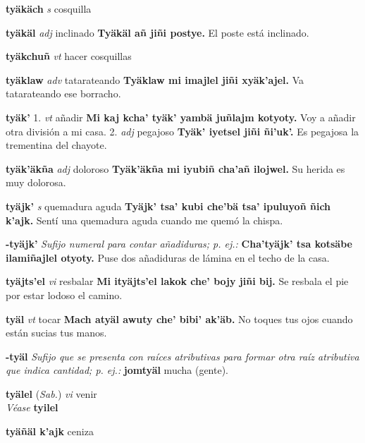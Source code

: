 \documentclass[10pt]{scrbook}
\newcommand{\entry}[1]{\textbf{#1}}
\newcommand{\onedefinition}[1]{#1.}
\newcommand{\nontranslationdef}[1]{\textit{#1}}
\newcommand{\partofspeech}[1]{\textit{#1}}
\newcommand{\spanishtranslation}[1]{#1}
\newcommand{\cholexample}[1]{\textbf{#1}}
\newcommand{\exampletranslation}[1]{#1}
\newcommand{\alsosee}[1]{\\\textit{Véase} \textbf{#1}}
\newcommand{\relevantdialect}[1]{(\textit{#1})}
\begin{document}
\begin{multicols}{2}
\entry{tyäkäch}
\partofspeech{s}
\spanishtranslation{cosquilla}

\entry{tyäkäl}
\partofspeech{adj}
\spanishtranslation{inclinado}
\cholexample{Tyäkäl añ jiñi postye.}
\exampletranslation{El poste está inclinado.}

\entry{tyäkchuñ}
\partofspeech{vt}
\spanishtranslation{hacer cosquillas}

\entry{tyäklaw}
\partofspeech{adv}
\spanishtranslation{tatarateando}
\cholexample{Tyäklaw mi imajlel jiñi xyäk'ajel.}
\exampletranslation{Va tatarateando ese borracho.}

\entry{tyäk'}
\onedefinition{1}
\partofspeech{vt}
\spanishtranslation{añadir}
\cholexample{Mi kaj kcha' tyäk' yambä juñlajm kotyoty.}
\exampletranslation{Voy a añadir otra división a mi casa.}
\onedefinition{2}
\partofspeech{adj}
\spanishtranslation{pegajoso}
\cholexample{Tyäk' iyetsel jiñi ñi'uk'.}
\exampletranslation{Es pegajosa la trementina del chayote.}

\entry{tyäk'äkña}
\partofspeech{adj}
\spanishtranslation{doloroso}
\cholexample{Tyäk'äkña mi iyubiñ cha'añ ilojwel.}
\exampletranslation{Su herida es muy dolorosa.}

\entry{tyäjk'}
\partofspeech{s}
\spanishtranslation{quemadura aguda}
\cholexample{Tyäjk' tsa' kubi che'bä tsa' ipuluyoñ ñich k'ajk.}
\exampletranslation{Sentí una quemadura aguda cuando me quemó la chispa.}

\entry{-tyäjk'}
\nontranslationdef{Sufijo numeral para contar añadiduras; p. ej.:}
\cholexample{Cha'tyäjk' tsa kotsäbe ilamiñajlel otyoty.}
\exampletranslation{Puse dos añadiduras de lámina en el techo de la casa.}

\entry{tyäjts'el}
\partofspeech{vi}
\spanishtranslation{resbalar}
\cholexample{Mi ityäjts'el lakok che' bojy jiñi bij.}
\exampletranslation{Se resbala el pie por estar lodoso el camino.}

\entry{tyäl}
\partofspeech{vt}
\spanishtranslation{tocar}
\cholexample{Mach atyäl awuty che' bibi' ak'äb.}
\exampletranslation{No toques tus ojos cuando están sucias tus manos.}

\entry{-tyäl}
\nontranslationdef{Sufijo que se presenta con raíces atributivas para formar otra raíz atributiva que indica cantidad; p. ej.:}
\cholexample{jomtyäl}
\exampletranslation{mucha (gente).}

\entry{tyälel}
\relevantdialect{Sab.}
\partofspeech{vi}
\spanishtranslation{venir}
\alsosee{tyilel}

\entry{tyäñäl k'ajk}
\spanishtranslation{ceniza}


\end{multicols}
\end{document}
